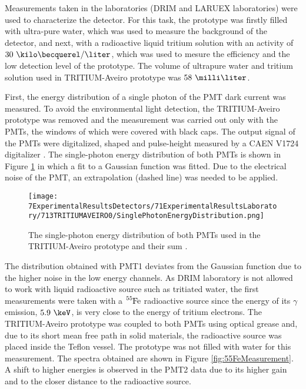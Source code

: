 Measurements taken in the laboratories (DRIM and LARUEX laboratories) were used to characterize the detector. For this task, the prototype was firstly filled with ultra-pure water, which was used to measure the background of the detector, and next, with a radioactive liquid tritium solution with an activity of $30~\kilo\becquerel/\liter$, which was used to mesure the efficiency and the low detection level of the prototype. The volume of ultrapure water and tritium solution used in TRITIUM-Aveiro prototype was $58~\milli\liter$. 

First, the energy distribution of a single photon of the PMT dark current was measured. To avoid the environmental light detection, the TRITIUM-Aveiro prototype was removed and the measurement was carried out only with the PMTs, the windows of which were covered with black caps. The output signal of the PMTs were digitalized, shaped and pulse-height measured by a CAEN V1724 digitalizer \cite{CAENV1724}. The single-photon energy distribution of both PMTs is shown in Figure \ref{fig:SinglePhotonEnergyDistribution} in which a fit to a Gaussian function was fitted. Due to the electrical noise of the PMT, an extrapolation (dashed line) was needed to be applied.

\begin{figure}[h]
\centering
\texttt{[image: 7ExperimentalResultsDetectors/71ExperimentalResultsLaboratory/713TRITIUMAVEIRO0/SinglePhotonEnergyDistribution.png]}
\caption{The single-photon energy distribution of both PMTs used in the TRITIUM-Aveiro prototype and their sum \cite{ExperimentalPaperCarlos}.\label{fig:SinglePhotonEnergyDistribution}}
\end{figure}

The distribution obtained with PMT1 deviates from the Gaussian function due to the higher noise in the low energy channels. As DRIM laboratory is not allowed to work with liquid radioactive source such as tritiated water, the first measurements were taken with a $\ce{^{55}Fe}$ radioactive source since the energy of its $\gamma$ emission, $5.9~\keV$, is very close to the energy of tritium electrons. The TRITIUM-Aveiro prototype was coupled to both PMTs using optical grease and, due to its short mean free path in solid materials, the radioactive source was placed inside the Teflon vessel. The prototype was not filled with water for this measurement. The spectra obtained are shown in Figure \ref{fig:55FeMeasurement}. A shift to higher energies is observed in the PMT2 data due to its higher gain and to the closer distance to the radioactive source.


